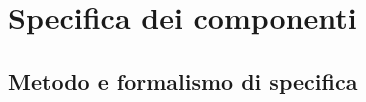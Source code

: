 \documentclass[../DefinizioneDiProdotto.tex]{subfiles}
\begin{document}
\section{Specifica dei componenti}
	\subsection{Metodo e formalismo di specifica}
	
\end{document}
